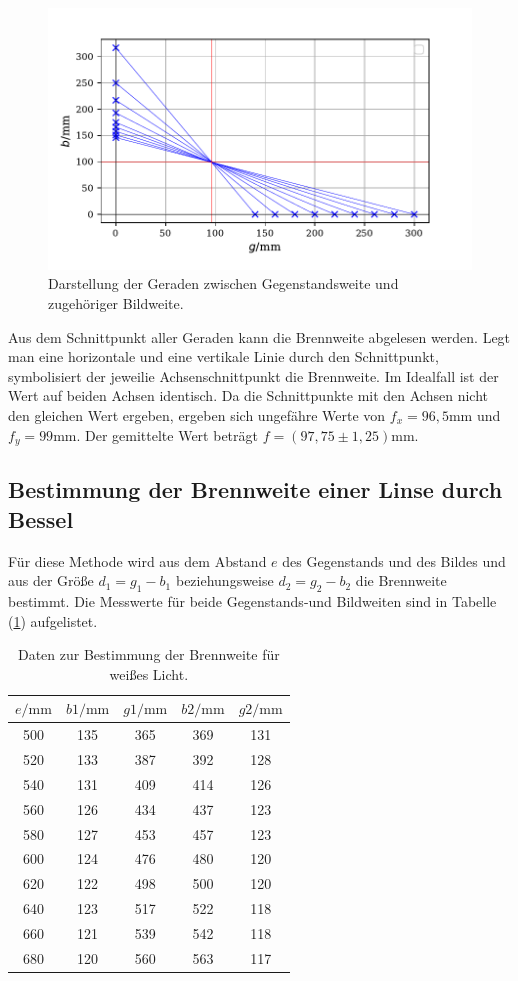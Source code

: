 \begin{figure}[H]
  \centering
  \includegraphics{plot1.pdf}
  \caption{Darstellung der Geraden zwischen Gegenstandsweite und zugehöriger Bildweite.}
  \label{fig:plot1}
\end{figure}

Aus dem Schnittpunkt aller Geraden kann die Brennweite abgelesen werden. Legt man eine horizontale und eine vertikale Linie durch den Schnittpunkt, symbolisiert der jeweilie Achsenschnittpunkt die Brennweite. Im Idealfall ist der Wert auf beiden Achsen identisch.
Da die Schnittpunkte mit den Achsen nicht den gleichen Wert ergeben, ergeben sich ungefähre Werte von $f_x = 96,5 \si{\milli\meter}$ und $f_y = 99\si{\milli\meter}$. Der gemittelte  Wert beträgt $f = (97,75 \pm 1,25)\si{\milli\meter}$.


\subsection{Bestimmung der Brennweite einer Linse durch Bessel}
Für diese Methode wird aus dem Abstand $e$ des Gegenstands und des Bildes und aus der Größe $d_1 = g_1-b_1$ beziehungsweise $d_2 = g_2-b_2$ die Brennweite bestimmt.
Die Messwerte für beide Gegenstands-und Bildweiten sind in Tabelle (\ref{tab:einzel2}) aufgelistet.
\begin{table}[H]
\centering
\caption{Daten zur Bestimmung der Brennweite für weißes Licht.}
\label{tab:einzel2}
\begin{tabular}{c c c c c}
\toprule
$e/\si{\milli\meter}$ & $b1/\si{\milli\meter}$ & $g1/\si{\milli\meter}$ & $b2/\si{\milli\meter}$ & $g2/\si{\milli\meter}$ \\
\midrule
500 &135	& 365	& 369	& 131\\
520 &133	& 387	& 392	& 128\\
540 &131	& 409	& 414	& 126\\
560 &126	& 434	& 437	& 123\\
580 &127	& 453	& 457	& 123\\
600 &124	& 476	& 480	& 120\\
620 &122	& 498	& 500	& 120\\
640 &123	& 517	& 522	& 118\\
660 &121	& 539	& 542	& 118\\	
680 &120	& 560	& 563	& 117\\
\bottomrule
\end{tabular}
\end{table}

